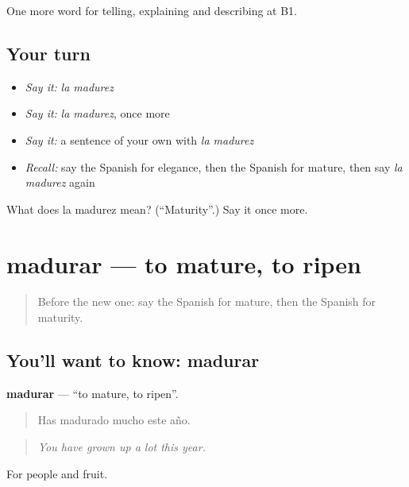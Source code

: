 \begin{grammarlens}[title={What you've built}]
One more word for telling, explaining and describing at B1.
\end{grammarlens}

\subsection*{Your turn}
\begin{itemize}
\raggedright
  \item \emph{Say it:} \emph{la madurez}
  \item \emph{Say it:} \emph{la madurez}, once more
  \item \emph{Say it:} a sentence of your own with \emph{la madurez}
  \item \emph{Recall:} say the Spanish for elegance, then the Spanish for mature, then say \emph{la madurez} again
\end{itemize}

\begin{tcolorbox}[breakable,colback=teal!4,colframe=teal!35!black,title={Before you move on}]
What does la madurez mean? (\textquotedblleft{}Maturity\textquotedblright{}.) Say it once more.
\end{tcolorbox}
\section[madurar]{madurar — to mature, to ripen}

\label{lesson:ES-C731-madurar}



\begin{quote}
Before the new one: say the Spanish for mature, then the Spanish for maturity.
\end{quote}

\subsection*{You'll want to know: madurar}
\textbf{madurar} — \textquotedblleft{}to mature, to ripen\textquotedblright{}.

\begin{quote}
Has madurado mucho este año.
\end{quote}

\begin{quote}
\emph{You have grown up a lot this year.}
\end{quote}

For people and fruit.

